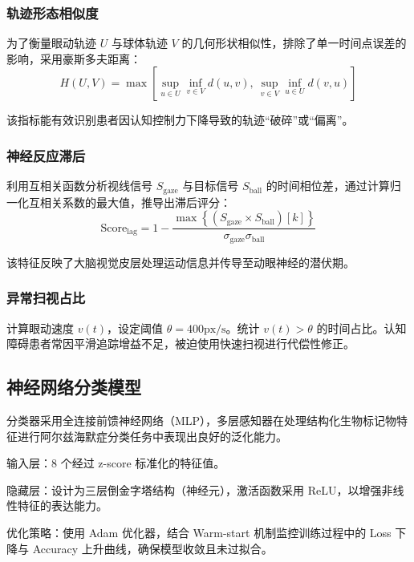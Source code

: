 \documentclass[12pt,hyperref,a4paper,UTF8]{ctexart}
\begin{document}
\subsubsection{轨迹形态相似度}
为了衡量眼动轨迹 $U$ 与球体轨迹 $V$ 的几何形状相似性，排除了单一时间点误差的影响，采用豪斯多夫距离：
\begin{equation}
    H(U,V)=\max\left[\sup_{u\in U}\inf_{v\in V}d(u,v),\ \sup_{v\in V}\inf_{u\in U}d(v,u)\right]
\end{equation}

该指标能有效识别患者因认知控制力下降导致的轨迹“破碎”或“偏离”。



\subsubsection{神经反应滞后}
利用互相关函数分析视线信号 $S_{\text{gaze}}$ 与目标信号 $S_{\text{ball}}$ 的时间相位差，通过计算归一化互相关系数的最大值，推导出滞后评分：
\begin{equation}
    \text{Score}_{\text{lag}}=1-\dfrac{\max\left\{(S_{\text{gaze}}\times S_{\text{ball}})[k]\right\}}{\sigma_{\text{gaze}}\sigma_{\text{ball}}}
\end{equation}

该特征反映了大脑视觉皮层处理运动信息并传导至动眼神经的潜伏期。



\subsubsection{异常扫视占比}
计算眼动速度 $v(t)$，设定阈值 $\theta=400\text{px/s}$。统计 $v(t)>\theta$ 的时间占比。认知障碍患者常因平滑追踪增益不足，被迫使用快速扫视进行代偿性修正。



\subsection{神经网络分类模型}
分类器采用全连接前馈神经网络（MLP），多层感知器在处理结构化生物标记物特征进行阿尔兹海默症分类任务中表现出良好的泛化能力\cite{shah2025multimodal}。

输入层：8 个经过 z-score 标准化的特征值。

隐藏层：设计为三层倒金字塔结构（神经元），激活函数采用 ReLU，以增强非线性特征的表达能力。

优化策略：使用 Adam 优化器，结合 Warm-start 机制监控训练过程中的 Loss 下降与 Accuracy 上升曲线，确保模型收敛且未过拟合。
\end{document}
